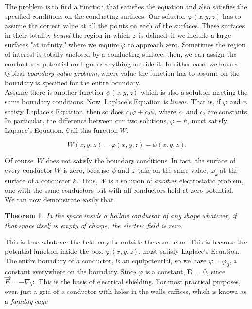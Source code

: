 \documentclass[svgnames]{article}
\newtheorem{theorem}{Theorem}		        %
\begin{document}
The problem is to find a function that satisfies the equation and also
satisfies the specified conditions on the conducting surfaces. Our solution
$\varphi (x,y,z)$ has to assume the correct value at all the points on each of
the surfaces. These surfaces in their totality \textit{bound} the region in
which $\varphi$ is defined, if we include a large surfaces "at infinity," where
we require $\varphi$ to approach zero. Sometimes the region of interest is
totally enclosed by a conducting surface; then, we can assign the conductor
a potential and ignore anything outside it. In either case, we have a typical
\textit{boundary-value problem}, where value the function has to assume
on the boundary is specified for the entire boundary.\\

Assume there is another function $\psi(x,y,z)$ which is also a solution
meeting the same boundary conditions. Now, Laplace's Equation is
\textit{linear}. That is, if $\varphi$ and $\psi$ satisfy Laplace's
Equation, then so does $c_1\varphi + c_2\psi$, where $c_1$ and $c_2$ are
constants. In particular, the difference between our two solutions, $\varphi
- \psi$, must satisfy Laplace's Equation. Call this function $W$. 

\[
W(x,y,z) = \varphi(x,y,z) - \psi(x,y,z)
.\] 

Of course, $W$ does not satisfy the boundary conditions. In fact, the surface
of every conductor $W$ is zero, because $\psi$ and $\varphi$ take on the same
value, $\varphi_k$ at the surface of a conductor $k$. Thus, $W$ is a solution
of \textit{another} electrostatic problem, one with the same conductors but
with all conductors held at zero potential. \\

We can now demonstrate easily that 

\begin{theorem}
  In the space inside a hollow conductor of any shape whatever, if that space
  itself is empty of charge, the electric field is zero.
\end{theorem} 

This is true whatever the field may be outside the conductor. This is because
the potential function inside the box, $\varphi(x,y,z)$, must satisfy Laplace's
Equation. The entire boundary of a conductor, is an equipotential, so we have
$\varphi = \varphi_0$, a constant everywhere on the boundary. Since $\varphi$
is a constant, \textbf{E} $= 0$, since $\vec{E} = -\nabla \varphi$. This is the
basis of electrical shielding. For most practical purposes, even just a grid of
a conductor with holes in the walls suffices, which is known as
a \textit{faraday cage}
\end{document}
